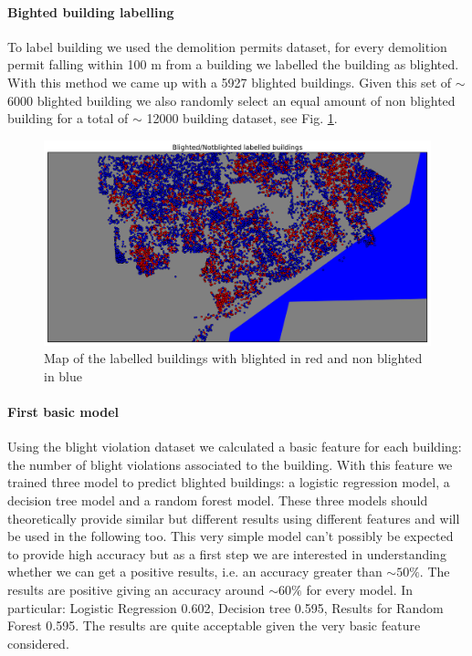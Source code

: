 \documentclass[a4paper,12pt]{article}
\begin{document}
\paragraph{Bighted building labelling}
To label building we used the demolition permits dataset, for every demolition permit falling within 100 m from a building we labelled the building as blighted. With this method we came up with a 5927 blighted buildings. Given this set of $\sim$ 6000 blighted building we also randomly select an equal amount of non blighted building for a total of $\sim$ 12000 building dataset, see Fig. \ref{label}.

\begin{figure}
\includegraphics[scale=0.55]{label.png}
\caption{Map of the labelled buildings with blighted in red and non blighted in blue}
\label{label}
\end{figure}

\paragraph{First basic model}
Using the blight violation dataset we calculated a basic feature for each building: the number of blight violations associated to the building. With this feature we trained three model to predict blighted buildings: a logistic regression model, a decision tree model and a random forest model. These three models should theoretically provide similar but different results using different features and will be used in the following  too. This very simple model can't possibly be expected to provide high accuracy but as a first step we are interested in understanding whether we can get a positive results, i.e. an accuracy greater than $\sim 50 \%$. The results are positive giving an accuracy around $\sim 60 \%$ for every model. In particular: 
Logistic Regression 0.602, Decision tree 0.595,
Results for Random Forest 0.595. The results are quite acceptable given the very basic feature considered.
\end{document}
